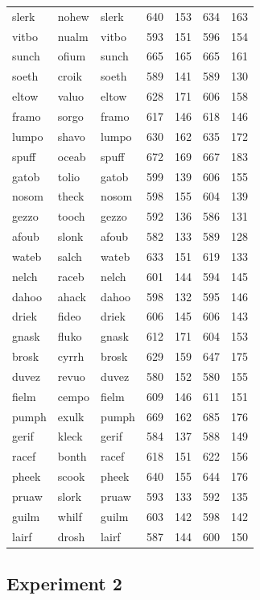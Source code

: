 \documentclass[
]{interact}
\begin{document}
\begin{longtable*}{lllrrrr}
slerk & nohew & slerk & 640 & 153 & 634 & 163 \\ 
vitbo & nualm & vitbo & 593 & 151 & 596 & 154 \\ 
sunch & ofium & sunch & 665 & 165 & 665 & 161 \\ 
soeth & croik & soeth & 589 & 141 & 589 & 130 \\ 
eltow & valuo & eltow & 628 & 171 & 606 & 158 \\ 
framo & sorgo & framo & 617 & 146 & 618 & 146 \\ 
lumpo & shavo & lumpo & 630 & 162 & 635 & 172 \\ 
spuff & oceab & spuff & 672 & 169 & 667 & 183 \\ 
gatob & tolio & gatob & 599 & 139 & 606 & 155 \\ 
nosom & theck & nosom & 598 & 155 & 604 & 139 \\ 
gezzo & tooch & gezzo & 592 & 136 & 586 & 131 \\ 
afoub & slonk & afoub & 582 & 133 & 589 & 128 \\ 
wateb & salch & wateb & 633 & 151 & 619 & 133 \\ 
nelch & raceb & nelch & 601 & 144 & 594 & 145 \\ 
dahoo & ahack & dahoo & 598 & 132 & 595 & 146 \\ 
driek & fideo & driek & 606 & 145 & 606 & 143 \\ 
gnask & fluko & gnask & 612 & 171 & 604 & 153 \\ 
brosk & cyrrh & brosk & 629 & 159 & 647 & 175 \\ 
duvez & revuo & duvez & 580 & 152 & 580 & 155 \\ 
fielm & cempo & fielm & 609 & 146 & 611 & 151 \\ 
pumph & exulk & pumph & 669 & 162 & 685 & 176 \\ 
gerif & kleck & gerif & 584 & 137 & 588 & 149 \\ 
racef & bonth & racef & 618 & 151 & 622 & 156 \\ 
pheek & scook & pheek & 640 & 155 & 644 & 176 \\ 
pruaw & slork & pruaw & 593 & 133 & 592 & 135 \\ 
guilm & whilf & guilm & 603 & 142 & 598 & 142 \\ 
lairf & drosh & lairf & 587 & 144 & 600 & 150 \\ 
\bottomrule
\end{longtable*}

\subsection*{Experiment 2}\label{experiment-2}
\end{document}
